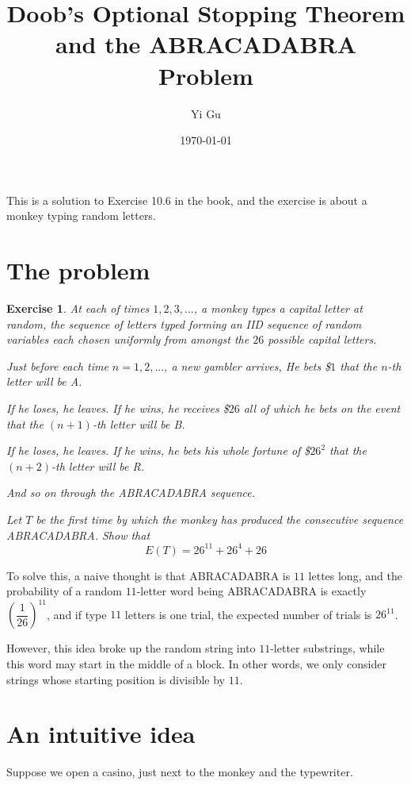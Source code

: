 \documentclass{article}
\title{Doob's Optional Stopping Theorem and the ABRACADABRA Problem}
\author{Yi Gu}
\date{\today}
\newtheorem{exercise}[theorem]{Exercise}
\begin{document}
    \maketitle
    This is a solution to Exercise 10.6 in the book,
    and the exercise is about a monkey typing random letters.

    \section{The problem}

    \begin{exercise}
      At each of times $1, 2, 3, \dots$, a monkey types a capital letter at random,
      the sequence of letters typed forming an IID sequence of random variables each chosen uniformly from amongst the $26$ possible capital letters.
      
      Just before each time $n = 1, 2, \dots$, a new gambler arrives,
      He bets \$$1$ that the $n$-th letter will be A.
      
      If he loses, he leaves.
      If he wins, he receives \$$26$ all of which he bets on the event that the $(n+1)$-th letter will be B.

      If he loses, he leaves.
      If he wins, he bets his whole fortune of \$$26^2$ that the $(n+2)$-th letter will be R.
      
      And so on through the ABRACADABRA sequence.

      Let $T$ be the first time by which the monkey has produced the consecutive sequence ABRACADABRA.
      Show that
      $$ E(T) = 26^11 + 26^4 + 26 $$
    \end{exercise}

    To solve this, a naive thought is that ABRACADABRA is $11$ lettes long, and the probability of a random $11$-letter word being ABRACADABRA is exactly $(\dfrac{1}{26})^{11}$,
    and if type $11$ letters is one trial,
    the expected number of trials is $26^{11}$.

    However, this idea broke up the random string into $11$-letter substrings,
    while this word may start in the middle of a block.
    In other words, we only consider strings whose starting position is divisible by $11$.

    \section{An intuitive idea}

    Suppose we open a casino, just next to the monkey and the typewriter.
\end{document}
